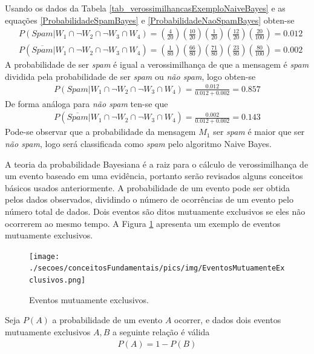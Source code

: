 \noindent
Usando os dados da Tabela \ref{tab_verossimilhancasExemploNaiveBayes} e as equações \eqref{ProbabilidadeSpamBayes} e \eqref{ProbabilidadeNaoSpamBayes} obten-se
\begin{align}
& P(Spam|W_{1} \cap \neg W_{2} \cap \neg W_{3} \cap W_{4}) = \left(\frac{4}{20}\right) \left(\frac{10}{20}\right) \left(\frac{1}{20}\right) \left(\frac{12}{20}\right) \left(\frac{20}{100}\right) = 0.012 \\
& P(\overline{Spam}|W_{1} \cap \neg W_{2} \cap \neg W_{3} \cap W_{4}) = \left(\frac{1}{80}\right) \left(\frac{66}{80}\right) \left(\frac{71}{80}\right) \left(\frac{23}{80}\right) \left(\frac{80}{100}\right) = 0.002
\end{align}
A probabilidade de ser \emph{spam} é igual a verossimilhança de que a mensagem é \emph{spam} dividida pela probabilidade de ser \emph{spam} ou \emph{não spam}, logo obten-se
\begin{align}
P(Spam|W_{1} \cap \neg W_{2} \cap \neg W_{3} \cap W_{4}) = \frac{0.012}{0.012 + 0.002} = 0.857
\end{align}
De forma análoga para \emph{não spam} ten-se que
\begin{align}
P(\overline{Spam}|W_{1} \cap \neg W_{2} \cap \neg W_{3} \cap W_{4}) = \frac{0.002}{0.012 + 0.002} = 0.143 
\end{align}
Pode-se observar que a probabilidade da mensagem \(M_{1}\) ser \emph{spam} é maior que ser \emph{não spam}, logo será classificada como \emph{spam} pelo algoritmo Naive Bayes.

A teoria da probabilidade Bayesiana é a raiz para o cálculo de verossimilhança de um evento baseado em uma evidência, portanto serão revisados alguns conceitos básicos usados anteriormente. A probabilidade de um evento pode ser obtida pelos dados observados, dividindo o número de ocorrências de um evento pelo número total de dados. Dois eventos são ditos mutuamente exclusivos se eles não ocorrerem ao mesmo tempo. A Figura \ref{FIGURA_EVENTOS_MUTUAMENTE_EXCLUSIVOS} apresenta um exemplo de eventos mutuamente exclusivos.
\begin{figure}[H]
	\centering
 	  \caption{Eventos mutuamente exclusivos.}
		\texttt{[image: ./secoes/conceitosFundamentais/pics/img/EventosMutuamenteExclusivos.png]}
	\label{FIGURA_EVENTOS_MUTUAMENTE_EXCLUSIVOS}
\end{figure}
Seja \(P(A)\) a probabilidade de um evento \(A\) ocorrer, e dados dois eventos mutuamente exclusivos \(A, B\) a seguinte relação é válida
\begin{align}
P(A) = 1 - P(B)
\end{align}

